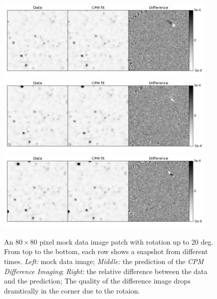 \documentclass[12pt, preprint]{aastex}
\newcommand{\project}[1]{\textsl{#1}}
\newcommand{\cpmdiff}{\project{CPM Difference Imaging}}
\begin{document}
\begin{figure}[p]
\begin{center}
\includegraphics[width=0.95\textwidth]{f6a}
\includegraphics[width=0.95\textwidth]{f6b}
\includegraphics[width=0.95\textwidth]{f6c}
\end{center}
\caption{
  \label{large_rotation}
  An $80\times 80$ pixel mock data image patch with rotation up to 20 deg. 
  From top to the bottom, each row shows a snapshot from different times.
  \emph{Left:} mock data image;
  \emph{Middle:} the prediction of the \cpmdiff;
  \emph{Right:} the relative difference between the data and the prediction;
  The quality of the difference image drops dramtically in the corner due to the rotaion.   
}
\end{figure}
\end{document}
